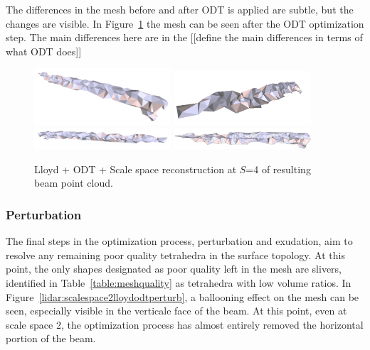 \documentclass[12pt]{drexelthesis}
\let\Oldsubsubsection\subsubsection
\renewcommand{\subsubsection}{\FloatBarrier\Oldsubsubsection}
\begin{document}
The differences in the mesh before and after ODT is applied are subtle, but the changes are visible. In Figure~\ref{lidar:scalespace4lloydodt} the mesh can be seen after the ODT optimization step. The main differences here are in the [[define the main differences in terms of what ODT does]]

\begin{figure}[!ht]
	\centering
		\includegraphics[width=2in]{real-lab-scans/meshed/optimized/scalespace4lloydodt00.png}
		\includegraphics[width=2in]{real-lab-scans/meshed/optimized/scalespace4lloydodt01.png}
		\includegraphics[width=2in]{real-lab-scans/meshed/optimized/scalespace4lloydodt02.png}
		\includegraphics[width=2in]{real-lab-scans/meshed/optimized/scalespace4lloydodt03.png}
		\caption[Lloyd + ODT + Scale space reconstruction at $S$=4 of segmented LiDAR data]{\centering Lloyd + ODT + Scale space reconstruction at $S$=4 of resulting beam point cloud.}
	\label{lidar:scalespace4lloydodt}
\end{figure}

\subsubsection{Perturbation}

The final steps in the optimization process, perturbation and exudation, aim to resolve any remaining poor quality tetrahedra in the surface topology. At this point, the only shapes designated as poor quality left in the mesh are slivers, identified in Table~\ref{table:meshquality} as tetrahedra with low volume ratios. In Figure~\ref{lidar:scalespace2lloydodtperturb}, a ballooning effect on the mesh can be seen, especially visible in the verticale face of the beam. At this point, even at scale space 2, the optimization process has almost entirely removed the horizontal portion of the beam.
\end{document}

